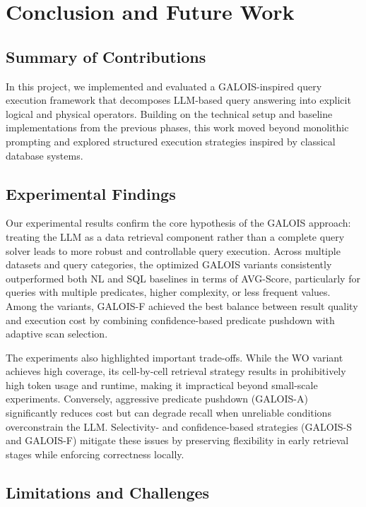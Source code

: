 \documentclass[11pt]{article}
\begin{document}
\clearpage
\section{Conclusion and Future Work}

\subsection{Summary of Contributions}
In this project, we implemented and evaluated a GALOIS-inspired query execution framework that decomposes LLM-based query answering into explicit logical and physical operators. Building on the technical setup and baseline implementations from the previous phases, this work moved beyond monolithic prompting and explored structured execution strategies inspired by classical database systems.

\subsection{Experimental Findings}
Our experimental results confirm the core hypothesis of the GALOIS approach: treating the LLM as a data retrieval component rather than a complete query solver leads to more robust and controllable query execution. Across multiple datasets and query categories, the optimized GALOIS variants consistently outperformed both NL and SQL baselines in terms of AVG-Score, particularly for queries with multiple predicates, higher complexity, or less frequent values. Among the variants, GALOIS-F achieved the best balance between result quality and execution cost by combining confidence-based predicate pushdown with adaptive scan selection.

The experiments also highlighted important trade-offs. While the WO variant achieves high coverage, its cell-by-cell retrieval strategy results in prohibitively high token usage and runtime, making it impractical beyond small-scale experiments. Conversely, aggressive predicate pushdown (GALOIS-A) significantly reduces cost but can degrade recall when unreliable conditions overconstrain the LLM. Selectivity- and confidence-based strategies (GALOIS-S and GALOIS-F) mitigate these issues by preserving flexibility in early retrieval stages while enforcing correctness locally.

\subsection{Limitations and Challenges}
\end{document}
